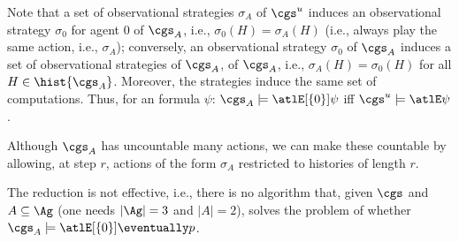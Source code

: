 Note that a set of observational strategies $\sigma_A$ of $\cgs^u$ induces an observational strategy $\sigma_0$ for agent $0$ of $\cgs_A$, i.e., $\sigma_0(H) = \sigma_A(H)$ 
(i.e., always play the same action, i.e., $\sigma_A$); conversely, an observational strategy $\sigma_0$ of $\cgs_A$ induces a set of observational strategies of $\cgs_A$, of $\cgs_A$, i.e., $\sigma_A(H) = \sigma_0(H)$ for all $H \in \hist{\cgs_A}$. Moreover, the strategies induce the same set of computations. Thus, for an \LTL formula $\psi$:
$\cgs_A \models \atlE[\{0\}] \psi$ iff $\cgs^u \models \atlE \psi$. 


\begin{remark}
Although $\cgs_A$ has uncountable many actions, we can make these countable by allowing, at step $r$, actions of the form $\sigma_A$ restricted to histories of length $r$.
\end{remark}

\begin{remark}
The reduction is not effective, i.e., there is no algorithm that, given $\cgs$ and $A \subseteq \Ag$ (one needs $|\Ag| = 3$ and $|A| = 2$), solves the problem of whether $\cgs_A \models \atlE[\{0\}] \eventually p$. 
\end{remark}
